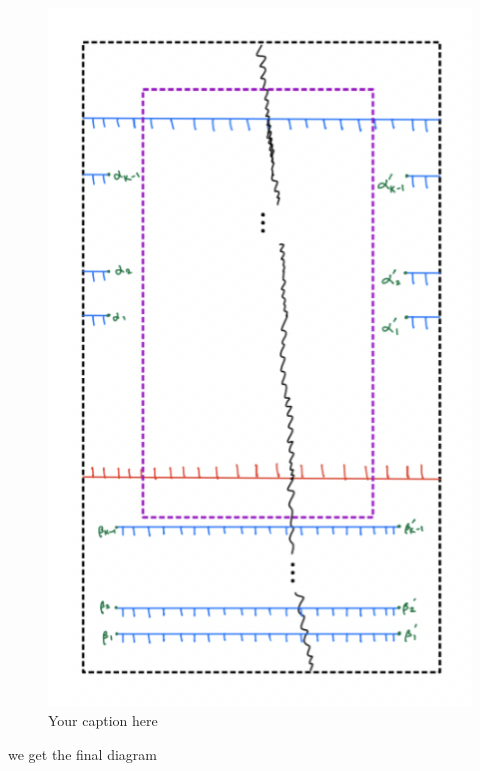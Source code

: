 \begin{figure}[H] %
    \centering
    \includegraphics[scale = 0.95]{diagrams/definition6/5.png} %
    \caption{Your caption here}
    \label{fig:your-label}
\end{figure}

we get the final diagram

